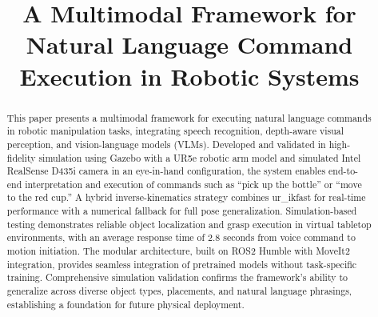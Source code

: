 \documentclass[conference]{IEEEtran}
\begin{document}
\title{A Multimodal Framework for Natural Language Command Execution in Robotic Systems}

\author{
\and
{}
\and
{}
}

\maketitle

\begin{abstract}
This paper presents a multimodal framework for executing natural language commands in robotic manipulation tasks, integrating speech recognition, depth-aware visual perception, and vision-language models (VLMs). Developed and validated in high-fidelity simulation using Gazebo with a UR5e robotic arm model and simulated Intel RealSense D435i camera in an eye-in-hand configuration, the system enables end-to-end interpretation and execution of commands such as ``pick up the bottle'' or ``move to the red cup.'' A hybrid inverse-kinematics strategy combines ur\_ikfast for real-time performance with a numerical fallback for full pose generalization. Simulation-based testing demonstrates reliable object localization and grasp execution in virtual tabletop environments, with an average response time of 2.8 seconds from voice command to motion initiation. The modular architecture, built on ROS2 Humble with MoveIt2 integration, provides seamless integration of pretrained models without task-specific training. Comprehensive simulation validation confirms the framework's ability to generalize across diverse object types, placements, and natural language phrasings, establishing a foundation for future physical deployment.
\end{abstract}
\end{document}
